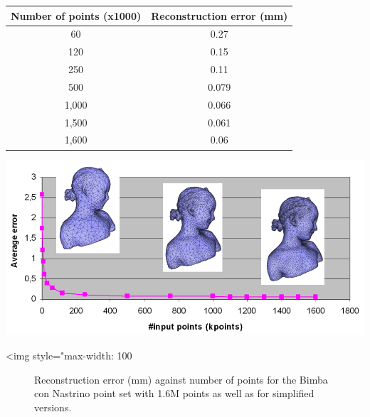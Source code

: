 \begin{tabular}{|c|c|}
  \hline
  Number of points (x1000) & Reconstruction error (mm) \\
  \hline
  60                         & 0.27 \\
  120                        & 0.15 \\
  250                        & 0.11 \\
  500                        & 0.079 \\
  1,000                       & 0.066 \\
  1,500                       & 0.061 \\
  1,600                       & 0.06 \\
  \hline
\end{tabular}

\begin{center}
    \begin{ccTexOnly}
        \includegraphics[width=1.0\textwidth]{Surface_reconstruction_points_3/simplification_bench}
    \end{ccTexOnly}
    \begin{ccHtmlOnly}
        <img style="max-width: 100%
    \end{ccHtmlOnly}
    \begin{figure}[h]
        \caption{Reconstruction error (mm) against number of points
                 for the Bimba con Nastrino point set with 1.6M points
                 as well as for simplified versions.}
        \label{Surface_reconstruction_points_3-fig-simplification_bench}
    \end{figure}
\end{center}






